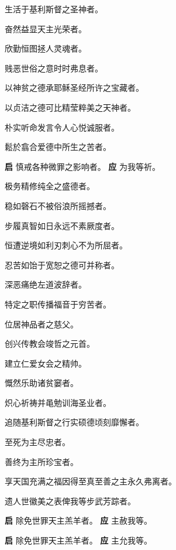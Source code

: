 \documentclass[UTF8,17pt]{ctexart}
\begin{document}
 ⽣活于基利斯督之圣神者。

 奋然益显天主光荣者。

 欣勤恒图拯⼈灵魂者。

 贱恶世俗之意时时弗息者。

 以神贫之德承耶稣圣经所许之宝藏者。

 以贞洁之德可⽐精莹粹美之天神者。

 朴实听命发⾔令⼈⼼悦诚服者。

 鬆於翕合爱德中所⽣之苦者。

\textbf{启} \quad 慎戒各种微罪之影响者。 \hfill \textbf{应} \quad 为我等祈。

 极务精修纯全之盛德者。

 稳如磬⽯不被俗浪所摇撼者。

 步履真智如⽇永远不素厥度者。

 恒遭逆境如利刃刺⼼不为所屈者。

 忍苦如饴于宽恕之德可并称者。

 深恶痛绝左道波辞者。

 特定之职传播福⾳于穷苦者。

 位居神品者之慈⽗。

 创兴传教会竣哲之元⾸。

 建⽴仁爱⼥会之精帅。

 慨然乐助诸贫窭者。

 炽⼼祈祷并黾勉训海圣业者。

 追随基利斯督之⾏实硕德顷刻靡懈者。

 ⾄死为主尽忠者。

 善终为主所珍宝者。

 享天国充满之福因得⾄真⾄善之主永久弗离者。

 遗⼈世徽美之表俾我等步武芳踪者。

\textbf{启} \quad 除免世罪天主羔⽺者。 \hfill \textbf{应} \quad 主赦我等。

\textbf{启} \quad 除免世罪天主羔⽺者。 \hfill \textbf{应} \quad 主允我等。
\end{document}
